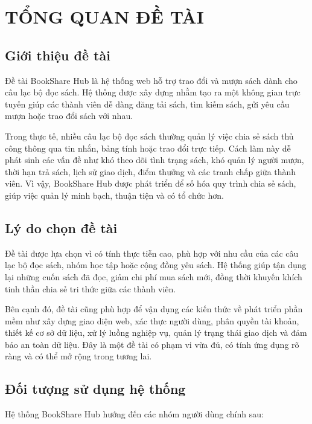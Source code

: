 \section{TỔNG QUAN ĐỀ TÀI}

\subsection{Giới thiệu đề tài}

Đề tài BookShare Hub là hệ thống web hỗ trợ trao đổi và mượn sách dành cho câu lạc bộ đọc sách. Hệ thống được xây dựng nhằm tạo ra một không gian trực tuyến giúp các thành viên dễ dàng đăng tải sách, tìm kiếm sách, gửi yêu cầu mượn hoặc trao đổi sách với nhau.

Trong thực tế, nhiều câu lạc bộ đọc sách thường quản lý việc chia sẻ sách thủ công thông qua tin nhắn, bảng tính hoặc trao đổi trực tiếp. Cách làm này dễ phát sinh các vấn đề như khó theo dõi tình trạng sách, khó quản lý người mượn, thời hạn trả sách, lịch sử giao dịch, điểm thưởng và các tranh chấp giữa thành viên. Vì vậy, BookShare Hub được phát triển để số hóa quy trình chia sẻ sách, giúp việc quản lý minh bạch, thuận tiện và có tổ chức hơn.


\subsection{Lý do chọn đề tài}

Đề tài được lựa chọn vì có tính thực tiễn cao, phù hợp với nhu cầu của các câu lạc bộ đọc sách, nhóm học tập hoặc cộng đồng yêu sách. Hệ thống giúp tận dụng lại những cuốn sách đã đọc, giảm chi phí mua sách mới, đồng thời khuyến khích tinh thần chia sẻ tri thức giữa các thành viên.

Bên cạnh đó, đề tài cũng phù hợp để vận dụng các kiến thức về phát triển phần mềm như xây dựng giao diện web, xác thực người dùng, phân quyền tài khoản, thiết kế cơ sở dữ liệu, xử lý luồng nghiệp vụ, quản lý trạng thái giao dịch và đảm bảo an toàn dữ liệu. Đây là một đề tài có phạm vi vừa đủ, có tính ứng dụng rõ ràng và có thể mở rộng trong tương lai.


\subsection{Đối tượng sử dụng hệ thống}

Hệ thống BookShare Hub hướng đến các nhóm người dùng chính sau:

